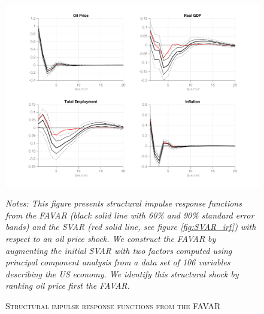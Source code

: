 \documentclass[11pt,a4paper]{article}
\begin{document}
\begin{figure}[H]
	\begin{center}
		\caption{\textsc{Structural impulse response functions from the FAVAR}}
		\label{fig:FAVAR_irf}
		\includegraphics[width=0.5\textheight]{Figures/FAVAR_irf}
	\end{center}
	\footnotesize{\emph{Notes:
			This figure presents structural impulse response functions from the FAVAR (black solid line with 60\% and 90\% standard error bands) and the SVAR (red solid line, see figure \ref{fig:SVAR_irf}) with respect to an oil price shock. We construct the FAVAR by augmenting the initial SVAR with two factors computed using principal component analysis from a data set of 106 variables describing the US economy. We identify this structural shock by ranking oil price first the FAVAR.}
	}
\end{figure}



\newpage
\end{document}
